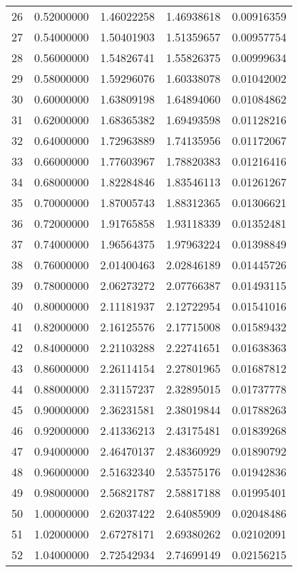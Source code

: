 \begin{tabular}{lrrrr}
26 & 0.52000000 & 1.46022258 & 1.46938618 & 0.00916359 \\
27 & 0.54000000 & 1.50401903 & 1.51359657 & 0.00957754 \\
28 & 0.56000000 & 1.54826741 & 1.55826375 & 0.00999634 \\
29 & 0.58000000 & 1.59296076 & 1.60338078 & 0.01042002 \\
30 & 0.60000000 & 1.63809198 & 1.64894060 & 0.01084862 \\
31 & 0.62000000 & 1.68365382 & 1.69493598 & 0.01128216 \\
32 & 0.64000000 & 1.72963889 & 1.74135956 & 0.01172067 \\
33 & 0.66000000 & 1.77603967 & 1.78820383 & 0.01216416 \\
34 & 0.68000000 & 1.82284846 & 1.83546113 & 0.01261267 \\
35 & 0.70000000 & 1.87005743 & 1.88312365 & 0.01306621 \\
36 & 0.72000000 & 1.91765858 & 1.93118339 & 0.01352481 \\
37 & 0.74000000 & 1.96564375 & 1.97963224 & 0.01398849 \\
38 & 0.76000000 & 2.01400463 & 2.02846189 & 0.01445726 \\
39 & 0.78000000 & 2.06273272 & 2.07766387 & 0.01493115 \\
40 & 0.80000000 & 2.11181937 & 2.12722954 & 0.01541016 \\
41 & 0.82000000 & 2.16125576 & 2.17715008 & 0.01589432 \\
42 & 0.84000000 & 2.21103288 & 2.22741651 & 0.01638363 \\
43 & 0.86000000 & 2.26114154 & 2.27801965 & 0.01687812 \\
44 & 0.88000000 & 2.31157237 & 2.32895015 & 0.01737778 \\
45 & 0.90000000 & 2.36231581 & 2.38019844 & 0.01788263 \\
46 & 0.92000000 & 2.41336213 & 2.43175481 & 0.01839268 \\
47 & 0.94000000 & 2.46470137 & 2.48360929 & 0.01890792 \\
48 & 0.96000000 & 2.51632340 & 2.53575176 & 0.01942836 \\
49 & 0.98000000 & 2.56821787 & 2.58817188 & 0.01995401 \\
50 & 1.00000000 & 2.62037422 & 2.64085909 & 0.02048486 \\
51 & 1.02000000 & 2.67278171 & 2.69380262 & 0.02102091 \\
52 & 1.04000000 & 2.72542934 & 2.74699149 & 0.02156215 \\

\end{tabular}
